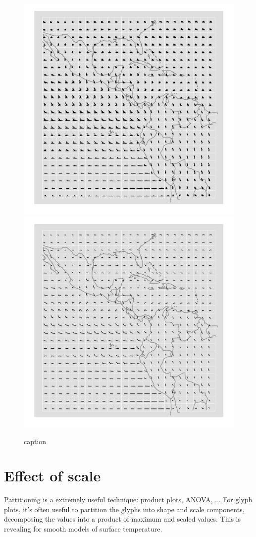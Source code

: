 \documentclass[oneside]{article}
\begin{document}
\begin{figure}[htbp]
  \centering
    \includegraphics[width=0.5\linewidth]{clouds}%
    \includegraphics[width=0.5\linewidth]{clouds-smooth}
  \caption{caption}
  \label{fig:cloud}
\end{figure}

\section{Effect of scale}

Partitioning is a extremely useful technique: product plots, ANOVA, ...  For glyph plots, it's often useful to partition the glyphs into shape and scale components, decomposing the values into a product of maximum and scaled values. This is revealing for smooth models of surface temperature.
\end{document}
